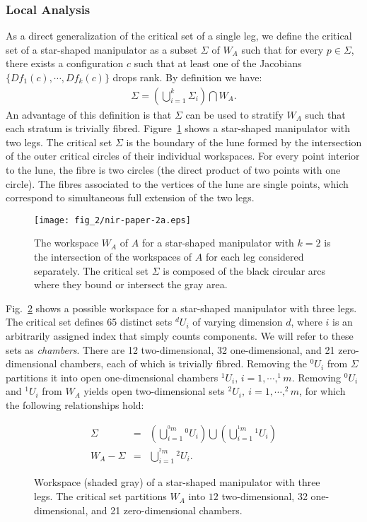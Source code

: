 \subsubsection{Local Analysis}
As a direct generalization of the critical set of a single leg, we
define the critical set of a star-shaped manipulator as a subset
$\Sigma$ of $W_A$ such that for every $p \in \Sigma$, there exists
a configuration $c$ such that at least one of the Jacobians
$\{Df_1(c),\cdots,Df_k(c)\}$ drops rank.  By definition we have:
%
\begin{eqnarray}
\label{eqn-01}
 \Sigma=\left(\bigcup_{i=1}^k \Sigma_i \right)\bigcap W_A.
\end{eqnarray}
%
An advantage of this definition is that $\Sigma$ can be used to
stratify $W_A$ such that each stratum is trivially fibred.
Figure~\ref{fig:double-leg} shows a star-shaped manipulator with
two legs.  The critical set $\Sigma$ is the boundary of the lune
formed by the intersection of the outer critical circles of their
individual workspaces.  For every point interior to the lune, the
fibre is two circles (the direct product of two points with one
circle). The fibres associated to the vertices of the lune are
single points, which correspond to simultaneous full extension of
the two legs.
%
\begin{figure}
  \centering
  \texttt{[image: fig\_2/nir-paper-2a.eps]}
 \caption{The workspace $W_A$ of $A$ for a star-shaped manipulator with $k=2$
    is the intersection of the workspaces of $A$ for each leg considered
    separately.  The critical set $\Sigma$ is composed of the black
    circular arcs where they bound or intersect the gray area.
    }
 \label{fig:double-leg}
\end{figure}
%
Fig.~\ref{fig:chambers} shows a possible workspace for a
star-shaped manipulator with three legs. The critical set defines
65 distinct sets $^dU_i$ of varying dimension $d$, where $i$ is an
arbitrarily assigned index that simply counts components. We will
refer to these sets as {\sl chambers}. There are 12
two-dimensional, 32 one-dimensional, and 21 zero-dimensional
chambers, each of which is trivially fibred. Removing the
$^0\!U_i$ from $\Sigma$ partitions it into open one-dimensional
chambers $^1\!U_i$, $i=1,\cdots,^1\!m$. Removing $^0\!U_i$ and
$^1\!U_i$ from $W_A$ yields open two-dimensional sets $^2\!U_i, \
i=1,\cdots,^2\!m$, for which the following relationships hold:
%

\begin{eqnarray}
\Sigma & = & \left(\bigcup_{i=1}^{^0\!m} {}^0\!U_i \right) \bigcup
\left(\bigcup_{i=1}^{^1\!m} {}^1\!U_i \right) \\[5pt]
W_A - \Sigma & = & \bigcup_{i=1}^{^2\!m} {}^2\!U_i.
\end{eqnarray}
\begin{figure}
 \vbox{
      }
 \caption{Workspace (shaded gray) of a star-shaped manipulator with
 three legs. The critical set partitions $W_A$ into $12$ two-dimensional,
 32 one-dimensional, and 21 zero-dimensional chambers.}
 \label{fig:chambers}
\end{figure}

